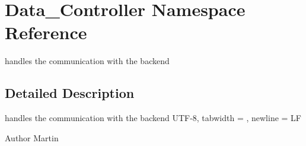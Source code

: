 \hypertarget{namespace_data___controller}{\section{Data\-\_\-\-Controller Namespace Reference}
\label{namespace_data___controller}
}


handles the communication with the backend  




\subsection{Detailed Description}
handles the communication with the backend U\-T\-F-\/8, tabwidth = , newline = L\-F \begin{DoxyAuthor}{Author}
Martin 
\end{DoxyAuthor}
